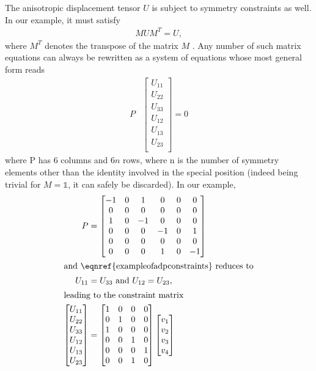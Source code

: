 \documentclass[11pt]{article}
\newcommand{\identity}{\mathbb{1}}
\begin{document}
The anisotropic displacement tensor $U$ is subject to symmetry constraints as well. In our example, it must satisfy
\begin{align}
M U M^T = U,
\label{eqn:special:pos:adp:constraint}
\end{align}
where $M^T$ denotes the transpose of the matrix $M$ \textbookref. Any number of such matrix equations can always be rewritten as a system of equations whose most general form reads
\begin{align}
P &\begin{bmatrix}
U_{11}\\
U_{22}\\
U_{33}\\
U_{12}\\
U_{13}\\
U_{23}\\
\end{bmatrix} = 0\label{eqn:exampleofadpconstraints}
\end{align}
where P has 6 columns and $6n$ rows, where n is the number of symmetry elements other than the identity involved in the special position (indeed  being trivial for $M=\identity$, it can safely be discarded). In our example,
\begin{align}
P &= \begin{bmatrix}
-1 & 0 & 1 & 0 & 0 & 0\\
0 & 0 & 0 & 0 & 0 & 0\\
1 & 0 & -1 & 0 & 0 & 0\\
0 & 0 & 0 & -1 & 0 & 1\\
0 & 0 & 0 & 0 & 0 & 0\\
0 & 0 & 0 & 1 & 0 & -1
\end{bmatrix}\\
\intertext{and \eqnref{exampleofadpconstraints} reduces to}
U_{11} &= U_{33}\text{ and } U_{12} = U_{23},\\
\intertext{leading to the constraint matrix}
\begin{bmatrix}
U_{11}\\
U_{22}\\
U_{33}\\
U_{12}\\
U_{13}\\
U_{23}\\
\end{bmatrix} &= \begin{bmatrix}
1 & 0 & 0 & 0\\
0 & 1 & 0 & 0\\
1 & 0 & 0 & 0\\
0 & 0 & 1 & 0\\
0 & 0 & 0 & 1\\
0 & 0 & 1 & 0
\end{bmatrix} \begin{bmatrix}
v_1\\
v_2\\
v_3\\
v_4
\end{bmatrix}
\end{align} 
\end{document}
